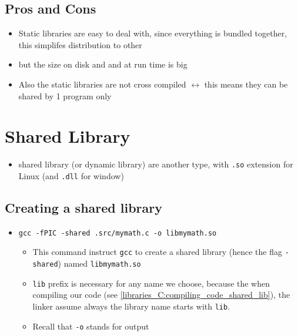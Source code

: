 \documentclass[12pt,a4paper]{book}
\begin{document}
\subsection{Pros and Cons}

\begin{itemize}
\item Static libraries are easy to deal with, since everything is bundled together, this simplifes distribution to other

\item but the size on disk and and at run time is big

\item Also the static libraries are not cross compiled $\leftrightarrow$ this means they can be shared by 1 program only

\end{itemize}


\section{Shared Library}

\begin{itemize}

\item shared library (or dynamic library) are another type, with \verb|.so| extension for Linux (and \verb|.dll| for window)

\end{itemize}

\subsection{Creating a shared library}

\begin{itemize}

\item \verb|gcc -fPIC -shared .src/mymath.c -o libmymath.so|

	\begin{itemize}
	\item This command instruct \verb|gcc| to create a shared library (hence the flag \verb|-shared|) named \verb|libmymath.so|
	
	\item \verb|lib| prefix is necessary for any name we choose, because the when compiling our code (see \ref{libraries_C:compiling_code_shared_lib}), the linker assume always the library name starts with \verb|lib|.
	
	\item Recall that \verb|-o| stands for output
	\end{itemize}

\end{itemize}
\end{document}
